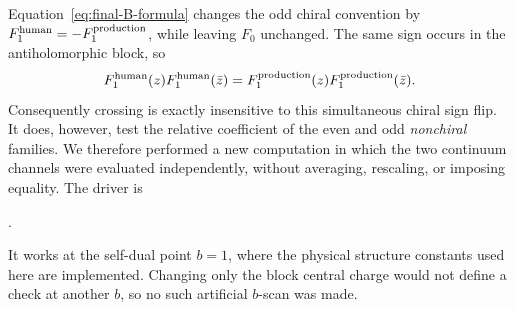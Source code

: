 \documentclass[11pt]{article}
\begin{document}
Equation~\eqref{eq:final-B-formula} changes the odd chiral convention by
\(F_1^{\rm human}=-F_1^{\rm production}\), while leaving \(F_0\) unchanged.
The same sign occurs in the antiholomorphic block, so
\begin{equation}
 F_1^{\rm human}(z)F_1^{\rm human}(\bar z)
 =F_1^{\rm production}(z)F_1^{\rm production}(\bar z).
 \label{eq:odd-sign-cancels}
\end{equation}
Consequently crossing is exactly insensitive to this simultaneous chiral
sign flip.  It does, however, test the relative coefficient of the even and
odd \emph{nonchiral} families.  We therefore performed a new computation in
which the two continuum channels were evaluated independently, without
averaging, rescaling, or imposing equality.  The driver is
\begin{center}
 .
\end{center}
It works at the self-dual point \(b=1\), where the physical structure
constants used here are implemented.  Changing only the block central charge
would not define a check at another \(b\), so no such artificial \(b\)-scan
was made.
\end{document}

